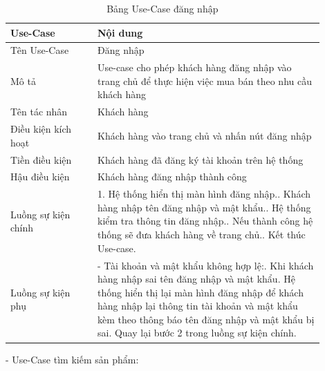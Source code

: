 \begin{longtable}[htp]{ |m{0.25\linewidth}|m{0.65\linewidth}|}
 \caption{Bảng Use-Case đăng nhập \label{long}}\\
 \hline
 Use-Case & Nội dung \\
 \hline
 Tên Use-Case & Đăng nhập \\
 \hline
 Mô tả & Use-case cho phép khách hàng đăng nhập vào trang chủ để thực hiện việc mua bán theo nhu cầu khách hàng\\
 \hline
 Tên tác nhân & Khách hàng\\
 \hline
 Điều kiện kích hoạt & Khách hàng vào trang chủ và nhấn nút đăng nhập\\
 \hline
 Tiền điều kiện & Khách hàng đã đăng ký tài khoản trên hệ thống\\
 \hline
 Hậu điều kiện & Khách hàng đăng nhập thành công\\
 \hline
 Luồng sự kiện chính & 
  1. Hệ thống hiển thị màn hình đăng nhập.\newline
  2. Khách hàng nhập tên đăng nhập và mật khẩu.\newline
  3. Hệ thống kiểm tra thông tin đăng nhập.\newline
  4. Nếu thành công hệ thống sẽ đưa khách hàng về trang chủ.\newline
  5. Kết thúc Use-case.	
 \\
 \hline
 Luồng sự kiện phụ & 
 - Tài khoản và mật khẩu không hợp lệ:\newline
 1. Khi khách hàng nhập sai tên đăng nhập và mật khẩu\newline
 2. Hệ thống hiển thị lại màn hình đăng nhập để khách hàng nhập lại thông tin tài khoản và mật khẩu kèm theo thông báo tên đăng nhập và mật khẩu bị sai.\newline
  Quay lại bước 2 trong luồng sự kiện chính.
 \\
 \hline
\end{longtable}
\par
- Use-Case tìm kiếm sản phẩm:

